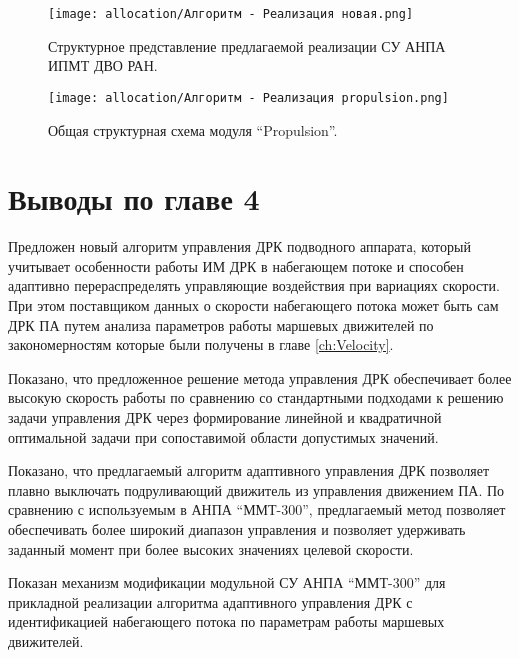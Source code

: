 \begin{figure}[ht]
    \centering
    \texttt{[image: allocation/Алгоритм - Реализация новая.png]}
    \caption{Структурное представление предлагаемой реализации СУ АНПА ИПМТ ДВО РАН.}
    \label{fig:software_new}
\end{figure}

\begin{figure}[ht]
    \centering
    \texttt{[image: allocation/Алгоритм - Реализация propulsion.png]}
    \caption{Общая структурная схема модуля ``Propulsion''.}
    \label{fig:propulsion-diagram}
\end{figure}


\section{Выводы по главе 4}
Предложен новый алгоритм управления ДРК подводного аппарата, который учитывает особенности работы ИМ ДРК в набегающем потоке и способен адаптивно перераспределять управляющие воздействия при вариациях скорости.
При этом поставщиком данных о скорости набегающего потока может быть сам ДРК ПА путем анализа параметров работы маршевых движителей по закономерностям которые были получены в главе \ref{ch:Velocity}.

Показано, что предложенное решение метода управления ДРК обеспечивает более высокую скорость работы по сравнению со стандартными подходами к решению задачи управления ДРК через формирование линейной и квадратичной оптимальной задачи при сопоставимой области допустимых значений.

Показано, что предлагаемый алгоритм адаптивного управления ДРК позволяет плавно выключать подруливающий движитель из управления движением ПА.
По сравнению с используемым в АНПА ``ММТ-300'', предлагаемый метод позволяет обеспечивать более широкий диапазон управления и позволяет удерживать заданный момент при более высоких значениях целевой скорости.

Показан механизм модификации модульной СУ АНПА ``ММТ-300'' для прикладной реализации алгоритма адаптивного управления ДРК с идентификацией набегающего потока по параметрам работы маршевых движителей.